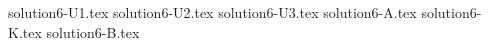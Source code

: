 \documentclass{article}
\begin{document}
{solution6-U1.tex}
{solution6-U2.tex}
{solution6-U3.tex}
{solution6-A.tex}
{solution6-K.tex}
{solution6-B.tex}
\end{document}
